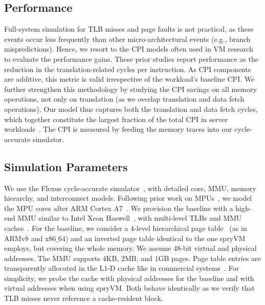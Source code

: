 \subsection{Performance}


Full-system simulation for TLB misses and page faults is not practical, as these events occur less frequently than other micro-architectural events (e.g., branch mispredictions). Hence, we resort to the CPI models often used in VM research~\cite{papadopoulou:prediction-based, saulsbury:recently-based, bhattacharjee:shared} to evaluate the performance gains. These prior studies report performance as the reduction in the translation-related cycles per instruction. As CPI components are additive, this metric is valid irrespective of the workload's baseline CPI. We further strengthen this methodology by studying the CPI savings on all memory operations, not only on translation (as we overlap translation and data fetch operations). Our model thus captures both the translation and data fetch cycles, which together constitute the largest fraction of the total CPI in server workloads~\cite{ferdman:clearing}. The CPI is measured by feeding the memory traces into our cycle-accurate simulator. 

\subsection{Simulation Parameters}
We use the Flexus cycle-accurate simulator~\cite{wenisch:simflex}, with detailed core, MMU, memory hierarchy, and interconnect models. Following prior work on MPUs~\cite{gao:practical, ahn:scalable, pugsley:ndc}, we model the MPU cores after ARM Cortex A7~\cite{arm:cortex-a7}. We provision the baseline with a high-end MMU similar to Intel Xeon Haswell~\cite{intel:tlbs, mammarlund:4th}, with multi-level TLBs and MMU caches~\cite{bhattacharjee:large-reach, barr:translation}. For the baseline, we consider a 4-level hierarchical page table~\cite{jacob:look} (as in ARMv$8$ and x$86\_64$) and an inverted page table identical to the one spryVM employs, but covering the whole memory. We assume 48-bit virtual and physical addresses. The MMU supports $4$KB, $2$MB, and $1$GB pages. Page table entries are transparently allocated in the L$1$-D cache like in commercial systems~\cite{intel:architectures}. For simplicity, we probe the cache with physical addresses for the baseline and with virtual addresses when using spryVM. Both behave identically as we verify that TLB misses never reference a cache-resident block.

